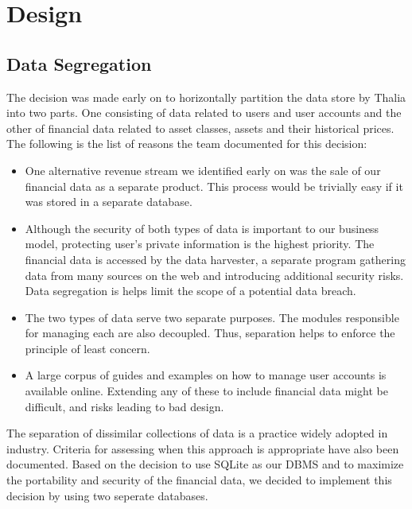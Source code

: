 \documentclass[main.tex]{subfiles}
\begin{document}
\section{Design}

\subsection{Data Segregation}

The decision was made early on to horizontally partition the data store by Thalia into two parts. One consisting of data related to users and user accounts and the other of financial data related to asset classes, assets and their historical prices. The following is the list of reasons the team documented for this decision:

\begin{itemize}

\item One alternative revenue stream we identified early on was the sale of our financial data as a separate product. This process would be trivially easy if it was stored in a separate database. 
\item Although the security of both types of data is important to our business model, protecting user’s private information is the highest priority. The financial data is accessed by the data harvester, a separate program gathering data from many sources on the web and introducing additional security risks. Data segregation is helps limit the scope of a potential data breach. \cite{ciscoSeg}
\item The two types of data serve two separate purposes. The modules responsible for managing each are also decoupled. Thus, separation helps to enforce the principle of least concern.
\item A large corpus of guides and examples on how to manage user accounts is available online. Extending any of these to include financial data might be difficult, and risks leading to bad design.

\end{itemize}

The separation of dissimilar collections of data is a practice widely adopted in industry. Criteria for assessing when this approach is appropriate have also been documented. \cite{dataSegImp} Based on the decision to use SQLite as our DBMS and to maximize the portability and security of the financial data, we decided to implement this decision by using two seperate databases.
\end{document}
